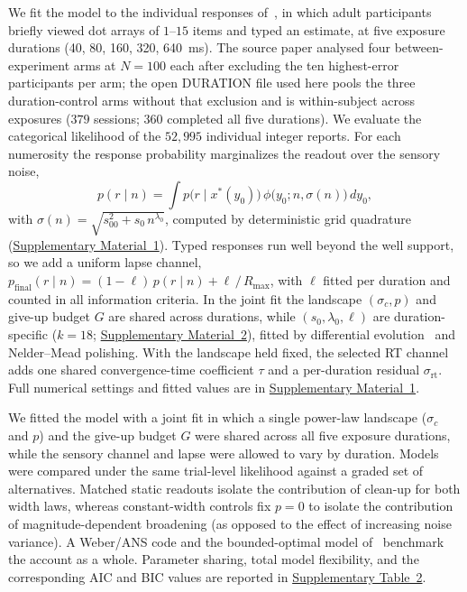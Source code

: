 \documentclass[Afour,sageh,times]{sagej}
\begin{document}
We fit the model to the individual responses of~\citet{cheyette_unified_2020}, in which adult participants briefly viewed dot arrays of $1$--$15$ items and typed an estimate, at five exposure durations (40, 80, 160, 320, 640~ms). The source paper analysed four between-experiment arms at $N=100$ each after excluding the ten highest-error participants per arm; the open DURATION file used here pools the three duration-control arms without that exclusion and is within-subject across exposures ($379$ sessions; $360$ completed all five durations). We evaluate the categorical likelihood of the $52{,}995$ individual integer reports. For each numerosity the response probability marginalizes the readout over the sensory noise,
%
\begin{equation}\label{eq:marginal}
p(r \mid n) = \int p\big(r \mid x^*(y_0)\big)\,\phi\!\big(y_0; n, \sigma(n)\big)\,dy_0,
\end{equation}
%
with $\sigma(n)=\sqrt{s_{00}^2 + s_0\,n^{\lambda_0}}$, computed by deterministic grid quadrature (\hyperref[sup-sm:methods]{Supplementary Material~1}). Typed responses run well beyond the well support, so we add a uniform lapse channel, $p_{\mathrm{final}}(r \mid n) = (1-\ell)\,p(r \mid n) + \ell\,/\,R_{\max}$, with $\ell$ fitted per duration and counted in all information criteria. In the joint fit the landscape $(\sigma_c,p)$ and give-up budget $G$ are shared across durations, while $(s_0,\lambda_0,\ell)$ are duration-specific ($k=18$; \hyperref[sup-sm:comparison]{Supplementary Material~2}), fitted by differential evolution~\citep{storn_differential_1997} and Nelder--Mead polishing. With the landscape held fixed, the selected RT channel adds one shared convergence-time coefficient $\tau$ and a per-duration residual $\sigma_{\mathrm{rt}}$. Full numerical settings and fitted values are in \hyperref[sup-sm:methods]{Supplementary Material~1}.

We fitted the model with a joint fit in which a single power-law landscape ($\sigma_c$ and $p$) and the give-up budget $G$ were shared across all five exposure durations, while the sensory channel and lapse were allowed to vary by duration. Models were compared under the same trial-level likelihood against a graded set of alternatives. Matched static readouts isolate the contribution of clean-up for both width laws, whereas constant-width controls fix $p=0$ to isolate the contribution of magnitude-dependent broadening (as opposed to the effect of increasing noise variance). A Weber/ANS code and the bounded-optimal model of~\citet{cheyette_unified_2020} benchmark the account as a whole. Parameter sharing, total model flexibility, and the corresponding AIC and BIC values are reported in \hyperref[sup-tab:model_comparison]{Supplementary Table~2}.
\end{document}
